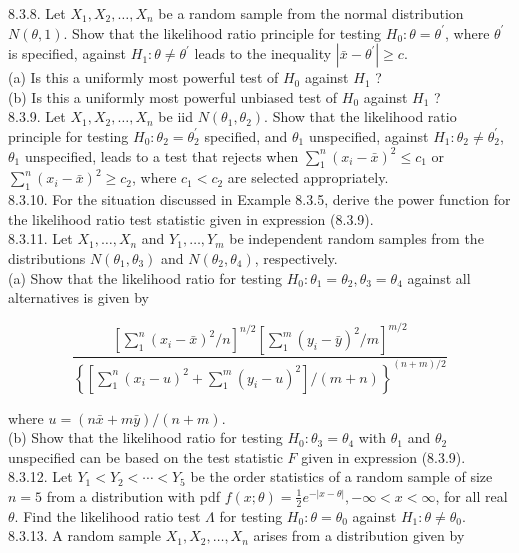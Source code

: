 8.3.8. Let $X_{1}, X_{2}, \ldots, X_{n}$ be a random sample from the normal distribution $N(\theta, 1)$. Show that the likelihood ratio principle for testing $H_{0}: \theta=\theta^{\prime}$, where $\theta^{\prime}$ is specified, against $H_{1}: \theta \neq \theta^{\prime}$ leads to the inequality $\left|\bar{x}-\theta^{\prime}\right| \geq c$.\\
(a) Is this a uniformly most powerful test of $H_{0}$ against $H_{1}$ ?\\
(b) Is this a uniformly most powerful unbiased test of $H_{0}$ against $H_{1}$ ?\\
8.3.9. Let $X_{1}, X_{2}, \ldots, X_{n}$ be iid $N\left(\theta_{1}, \theta_{2}\right)$. Show that the likelihood ratio principle for testing $H_{0}: \theta_{2}=\theta_{2}^{\prime}$ specified, and $\theta_{1}$ unspecified, against $H_{1}: \theta_{2} \neq \theta_{2}^{\prime}$, $\theta_{1}$ unspecified, leads to a test that rejects when $\sum_{1}^{n}\left(x_{i}-\bar{x}\right)^{2} \leq c_{1}$ or $\sum_{1}^{n}\left(x_{i}-\bar{x}\right)^{2} \geq c_{2}$, where $c_{1}<c_{2}$ are selected appropriately.\\
8.3.10. For the situation discussed in Example 8.3.5, derive the power function for the likelihood ratio test statistic given in expression (8.3.9).\\
8.3.11. Let $X_{1}, \ldots, X_{n}$ and $Y_{1}, \ldots, Y_{m}$ be independent random samples from the distributions $N\left(\theta_{1}, \theta_{3}\right)$ and $N\left(\theta_{2}, \theta_{4}\right)$, respectively.\\
(a) Show that the likelihood ratio for testing $H_{0}: \theta_{1}=\theta_{2}, \theta_{3}=\theta_{4}$ against all alternatives is given by

$$
\frac{\left[\sum_{1}^{n}\left(x_{i}-\bar{x}\right)^{2} / n\right]^{n / 2}\left[\sum_{1}^{m}\left(y_{i}-\bar{y}\right)^{2} / m\right]^{m / 2}}{\left\{\left[\sum_{1}^{n}\left(x_{i}-u\right)^{2}+\sum_{1}^{m}\left(y_{i}-u\right)^{2}\right] /(m+n)\right\}^{(n+m) / 2}}
$$

where $u=(n \bar{x}+m \bar{y}) /(n+m)$.\\
(b) Show that the likelihood ratio for testing $H_{0}: \theta_{3}=\theta_{4}$ with $\theta_{1}$ and $\theta_{2}$ unspecified can be based on the test statistic $F$ given in expression (8.3.9).\\
8.3.12. Let $Y_{1}<Y_{2}<\cdots<Y_{5}$ be the order statistics of a random sample of size $n=5$ from a distribution with pdf $f(x ; \theta)=\frac{1}{2} e^{-|x-\theta|},-\infty<x<\infty$, for all real $\theta$. Find the likelihood ratio test $\Lambda$ for testing $H_{0}: \theta=\theta_{0}$ against $H_{1}: \theta \neq \theta_{0}$.\\
8.3.13. A random sample $X_{1}, X_{2}, \ldots, X_{n}$ arises from a distribution given by

